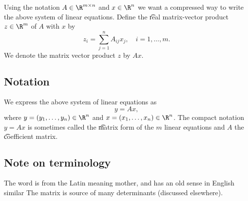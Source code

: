 Using the notation $A \in \R ^{m \times  n}$ and $x \in \R ^n$ we want a compressed way to write the above system of linear equations.
Define the \t{real matrix-vector product} $z \in \R ^m$ of $A$ with $x$ by
    \[
z_{i} = \sum_{j = 1}^{n} A_{ij}x_j, \quad i = 1, \dots , m.
    \]
We denote the matrix vector product $z$ by $Ax$.

\subsection*{Notation}

We express the above system of linear equations as
    \[
y = Ax,
    \]
where $y = (y_1, \dots , y_n) \in \R ^{n}$ and $x = (x_1, \dots , x_n) \in \R ^n$.
The compact notation $y = Ax$ is sometimes called the \t{matrix form} of the $m$ linear equations and $A$ the \t{coefficient matrix}.

\subsection*{Note on terminology}

The word  is from the Latin  meaning mother, and has an old sense in English similar 
The matrix is source of many determinants (discussed elsewhere).

